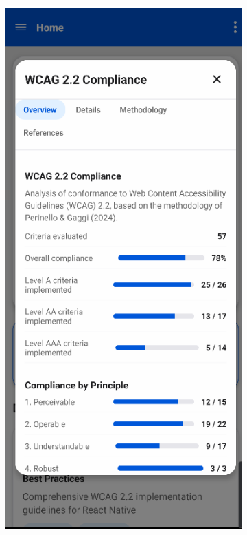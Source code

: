 \begin{figure}[ht]
    \centering
    \begin{subfigure}[b]{0.48\textwidth}
        \centering
        \includegraphics[width=\linewidth]{img/wcag-compliance.png}

\end{subfigure}
\end{figure}
